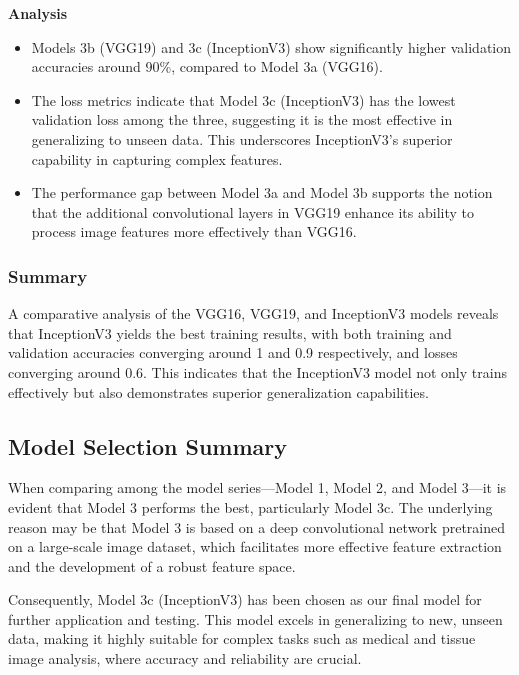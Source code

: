 \textbf{Analysis}
\begin{itemize}
    \item Models 3b (VGG19) and 3c (InceptionV3) show significantly higher validation accuracies around 90\%, compared to Model 3a (VGG16).
    \item The loss metrics indicate that Model 3c (InceptionV3) has the lowest validation loss among the three, suggesting it is the most effective in generalizing to unseen data. This underscores InceptionV3's superior capability in capturing complex features.
    \item The performance gap between Model 3a and Model 3b supports the notion that the additional convolutional layers in VGG19 enhance its ability to process image features more effectively than VGG16.
\end{itemize}


\subsubsection{Summary}

A comparative analysis of the VGG16, VGG19, and InceptionV3 models reveals that InceptionV3 yields the best training results, with both training and validation accuracies converging around 1 and 0.9 respectively, and losses converging around 0.6. This indicates that the InceptionV3 model not only trains effectively but also demonstrates superior generalization capabilities.

\subsection{Model Selection Summary}

When comparing among the model series—Model 1, Model 2, and Model 3—it is evident that Model 3 performs the best, particularly Model 3c. The underlying reason may be that Model 3 is based on a deep convolutional network pretrained on a large-scale image dataset, which facilitates more effective feature extraction and the development of a robust feature space.

Consequently, Model 3c (InceptionV3) has been chosen as our final model for further application and testing. This model excels in generalizing to new, unseen data, making it highly suitable for complex tasks such as medical and tissue image analysis, where accuracy and reliability are crucial.

